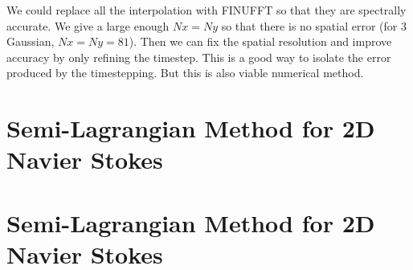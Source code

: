 \documentclass[11pt,letterpaper]{article}
\begin{document}
We could replace all the interpolation with FINUFFT so that they are spectrally accurate. We give a large enough $Nx = Ny$ so that there is no spatial error (for 3 Gaussian, $Nx = Ny = 81$). Then we can fix the spatial resolution and improve accuracy by only refining the timestep. This is a good way to isolate the error produced by the timestepping. But this is also viable numerical method. 


\section{Semi-Lagrangian Method for 2D Navier Stokes}\label{sec:nonli_adv}



\section{Semi-Lagrangian Method for 2D Navier Stokes}\label{sec:adv_NS}


\newpage


\end{document}
